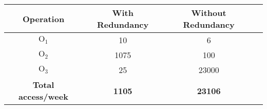 \begin{table}[!h]
	\begin{center}
		\begin{tabular}{ | c | c | c | c | }
			\hline
			\textbf{Operation} & \textbf{With Redundancy} & \textbf{Without Redundancy} \\ \hline
			$ \textrm{O}_\textrm{1} $ & 10 & 6\\ \hline
			$ \textrm{O}_\textrm{2} $ & 1075 & 100 \\ \hline
			$ \textrm{O}_\textrm{3} $ & 25 & 23000 \\\hline
			\textbf{Total access/week } & 	\textbf{1105} &	\textbf{23106} \\\hline
		\end{tabular}
	\end{center}
\end{table}

